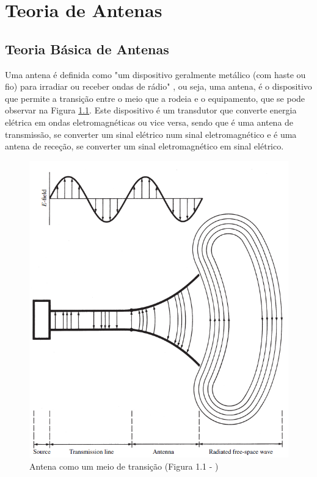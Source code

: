 
\chapter{Teoria de Antenas} %
\label{chap:Chapter3} %

\section{Teoria Básica de Antenas}
Uma antena é definida como "um dispositivo geralmente metálico (com haste ou fio) para irradiar ou receber ondas de rádio" \parencite{Balanis2016}, ou seja, uma antena, é o dispositivo que permite a transição entre o meio que a rodeia e o equipamento, que se pode observar na Figura \ref{fig:antena transicao}. 
Este dispositivo é um transdutor que converte energia elétrica em ondas eletromagnéticas ou vice versa, sendo que é uma antena de transmissão, se converter um sinal elétrico num sinal eletromagnético e é uma antena de receção, se converter um sinal eletromagnético em sinal elétrico. 

\begin{figure}[h]
\centering
\includegraphics[scale=0.6]{chapters/ch3/assets/Antenna_transicao}
\decoRule
\caption[Antena como meio de transição]{Antena como um meio de transição (Figura 1.1 - \cite{Balanis2016})}
\label{fig:antena transicao}
\end{figure}


